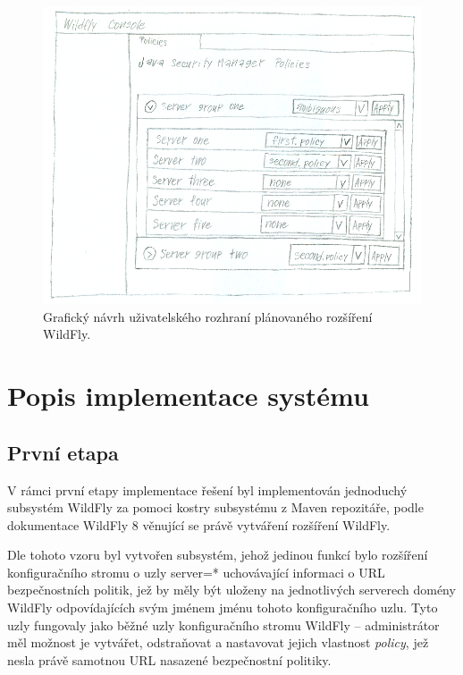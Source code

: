 \begin{figure}[ht]
  \centering
  \includegraphics[width=14cm]{fig/mockup}
  \caption{Grafický návrh uživatelského rozhraní plánovaného rozšíření WildFly.}
\end{figure}

\chapter{Popis implementace systému} \label{implementace}

\section{První etapa}

V rámci první etapy implementace řešení byl implementován jednoduchý subsystém WildFly za pomoci kostry subsystému z Maven repozitáře, podle dokumentace WildFly 8 věnující se právě vytváření rozšíření WildFly. \cite{WildFlyExtending}

Dle tohoto vzoru byl vytvořen subsystém, jehož jedinou funkcí bylo rozšíření konfiguračního stromu o uzly server=* uchovávající informaci o URL bezpečnostních politik, jež by měly být uloženy na jednotlivých serverech domény WildFly odpovídajících svým jménem jménu tohoto konfiguračního uzlu. Tyto uzly fungovaly jako běžné uzly konfiguračního stromu WildFly -- administrátor měl možnost je vytvářet, odstraňovat a nastavovat jejich vlastnost {\it policy}, jež nesla právě samotnou URL nasazené bezpečnostní politiky.

